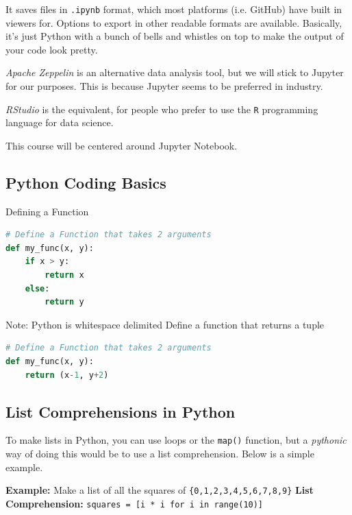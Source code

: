 \documentclass[english, 10pt]{article}
\begin{document}
It saves files in \texttt{.ipynb} format, which most platforms (i.e. GitHub) have built in viewers for. Options to export in other readable formats are available. Basically, it's just Python with a bunch of bells and whistles on top to make the output of your code look pretty.\newline

\textit{Apache Zeppelin} is an alternative data analysis tool, but we will stick to Jupyter for our purposes. This is because Jupyter seems to be preferred in industry.\newline

\textit{RStudio} is the equivalent, for people who prefer to use the \texttt{R} programming language for data science.\newline

This course will be centered around Jupyter Notebook.
\subsection{Python Coding Basics}
Defining a Function
{\centering
\begin{lstlisting}[language=python]
# Define a Function that takes 2 arguments
def my_func(x, y):
	if x > y:
		return x
	else:
		return y
\end{lstlisting}
}
Note: Python is whitespace delimited
Define a function that returns a tuple

{\centering
\begin{lstlisting}[language=python]
# Define a Function that takes 2 arguments
def my_func(x, y):
	return (x-1, y+2)
\end{lstlisting}
}

\subsection{List Comprehensions in Python}

To make lists in Python, you can use loops or the \texttt{map()} function, but a \textit{pythonic} way of doing this would be to use a list comprehension. Below is a simple example.\newline

\begin{myproof}
\textbf{Example:} Make a list of all the squares of \texttt{\{0,1,2,3,4,5,6,7,8,9\}}\newline\newline
\textbf{List Comprehension:}\newline
\texttt{squares = [i * i for i in range(10)]}
\end{myproof}
\end{document}
